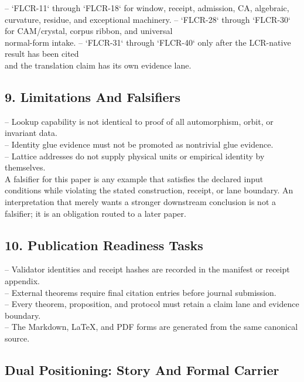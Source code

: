 \documentclass[11pt]{article}
\begin{document}
\noindent{}-- `FLCR-11` through `FLCR-18` for window, receipt, admission, CA, algebraic,\\
  curvature, residue, and exceptional machinery.
\noindent{}-- `FLCR-28` through `FLCR-30` for CAM/crystal, corpus ribbon, and universal\\
  normal-form intake.
\noindent{}-- `FLCR-31` through `FLCR-40` only after the LCR-native result has been cited\\
  and the translation claim has its own evidence lane.

\subsection*{9. Limitations And Falsifiers}

\noindent{}-- Lookup capability is not identical to proof of all automorphism, orbit, or invariant data.\\
\noindent{}-- Identity glue evidence must not be promoted as nontrivial glue evidence.\\
\noindent{}-- Lattice addresses do not supply physical units or empirical identity by themselves.\\

A falsifier for this paper is any example that satisfies the declared input
conditions while violating the stated construction, receipt, or lane boundary.
An interpretation that merely wants a stronger downstream conclusion is not a
falsifier; it is an obligation routed to a later paper.

\subsection*{10. Publication Readiness Tasks}

\noindent{}-- Validator identities and receipt hashes are recorded in the manifest or receipt appendix.\\
\noindent{}-- External theorems require final citation entries before journal submission.\\
\noindent{}-- Every theorem, proposition, and protocol must retain a claim lane and evidence boundary.\\
\noindent{}-- The Markdown, LaTeX, and PDF forms are generated from the same canonical source.\\

\subsection*{Dual Positioning: Story And Formal Carrier}
\end{document}
